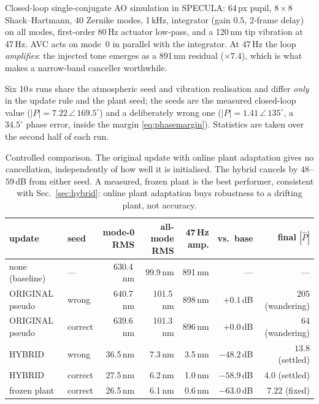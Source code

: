 \documentclass[11pt]{article}
\newcommand{\SI}[2]{#1\,#2}
\begin{document}
Closed-loop single-conjugate AO simulation in SPECULA: \SI{64}{px} pupil,
$8\times8$ Shack--Hartmann, 40 Zernike modes, \SI{1}{kHz}, integrator
(gain $0.5$, 2-frame delay) on all modes, first-order \SI{80}{Hz} actuator
low-pass, and a \SI{120}{nm} tip vibration at \SI{47}{Hz}. AVC acts on
mode~0 in parallel with the integrator. At \SI{47}{Hz} the loop
\emph{amplifies}: the injected tone emerges as a \SI{891}{nm} residual
($\times7.4$), which is what makes a narrow-band canceller worthwhile.

Six \SI{10}{s} runs share the atmospheric seed and vibration realisation
and differ \emph{only} in the update rule and the plant seed; the seeds are
the measured closed-loop value ($|P|=7.22\,\angle\,169.5^\circ$) and a
deliberately wrong one ($|P|=1.41\,\angle\,135^\circ$, a $34.5^\circ$ phase
error, inside the margin \eqref{eq:phasemargin}). Statistics are taken over
the second half of each run.

\begin{table}[h]
  \centering\small
  \begin{tabular}{llrrrrr}
    \toprule
    update & seed & mode-0 RMS & all-mode RMS & \SI{47}{Hz} amp. & vs.\ base & final $|\hat P|$\\
    \midrule
    none (baseline) & ---     & \SI{630.4}{nm} & \SI{99.9}{nm}  & \SI{891}{nm} & ---        & ---\\
    \midrule
    ORIGINAL pseudo & wrong   & \SI{640.7}{nm} & \SI{101.5}{nm} & \SI{898}{nm} & $+0.1$\,dB & $205$ (wandering)\\
    ORIGINAL pseudo & correct & \SI{639.6}{nm} & \SI{101.3}{nm} & \SI{896}{nm} & $+0.0$\,dB & $64$ (wandering)\\
    \midrule
    HYBRID          & wrong   & \SI{36.5}{nm}  & \SI{7.3}{nm}   & \SI{3.5}{nm} & $\mathbf{-48.2}$\,dB & $13.8$ (settled)\\
    HYBRID          & correct & \SI{27.5}{nm}  & \SI{6.2}{nm}   & \SI{1.0}{nm} & $\mathbf{-58.9}$\,dB & $4.0$ (settled)\\
    \midrule
    frozen plant    & correct & \SI{26.5}{nm}  & \SI{6.1}{nm}   & \SI{0.6}{nm} & $-63.0$\,dB & $7.22$ (fixed)\\
    \bottomrule
  \end{tabular}
  \caption{Controlled comparison. The original update with online plant
  adaptation gives no cancellation, independently of how well it is
  initialised. The hybrid cancels by $48$--$59$\,dB from either seed. A
  measured, frozen plant is the best performer, consistent with
  Sec.~\ref{sec:hybrid}: online plant adaptation buys robustness to a
  drifting plant, not accuracy.}
  \label{tab:cmp}
\end{table}
\end{document}
